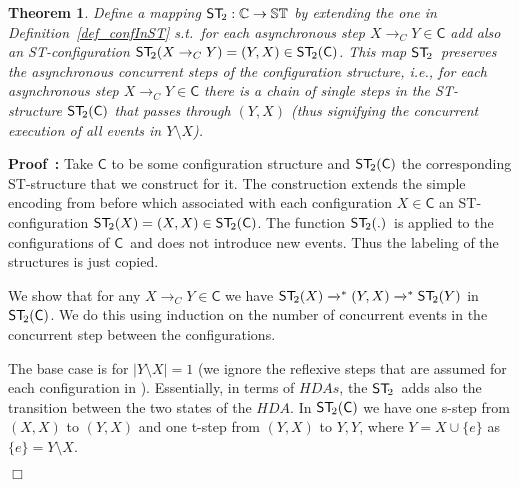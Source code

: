\documentclass[submission,copyright,creativecommons]{eptcs}
\newtheorem{theorem}{Theorem}[section]
\newenvironment{proof}[1][\!\!\,]{\vspace{1ex}\noindent\textbf{Proof #1: }}{\hfill$\Box$\vspace{2ex}}
\newcounter{case}
\newcommand\HDA{\ensuremath{\mathit{HDA}}}
\newcommand\HDAs{\ensuremath{\mathit{HDAs}}}
\newcommand\C{\ensuremath{\mathsf{C}}}
\newcommand\allC{\ensuremath{\mathbb{C}}}
\newcommand\allST{\ensuremath{\mathbb{ST}}}
\newcommand\stepTransConfGlabbeek{\ensuremath{\rightarrow_{C}}}
\newcommand\cintostSecond{\ensuremath{\mathsf{ST}_{\hspace{-0.4ex}2}}}
\newcommand\STofC[1]{\ensuremath{\cintostSecond(#1)}}
\newcommand{\transition}[1]{\ensuremath{\xrightarrow{#1}}}
\begin{document}
\begin{theorem}\label{th_configtoSTsteps}
Define a mapping $\cintostSecond:\allC\rightarrow\allST$ by extending the one in Definition~\ref{def_confInST} s.t.\ for each asynchronous step $X\stepTransConfGlabbeek Y\!\in\!\C$ add also an ST-configuration $\STofC{X\stepTransConfGlabbeek Y}=(Y,X)\in\STofC{\C}$.
This map \cintostSecond\ preserves the asynchronous concurrent steps of the configuration structure, i.e., for each asynchronous step $X\stepTransConfGlabbeek Y\in \C$ there is a chain of single steps in the ST-structure $\STofC{\C}$ that passes through $(Y,X)$ (thus signifying the concurrent execution of all events in $Y\setminus X$).
\end{theorem}

\begin{proof}
Take $\C$ to be some configuration structure and $\STofC{\C}$ the corresponding ST-structure that we construct for it.
The construction extends the simple encoding from before which associated with each configuration $X\in \C$ an ST-configuration $\STofC{X}=(X,X)\in\STofC{\C}$. 
The function \STofC{.}\ is applied to the configurations of \C\ and does not introduce new events. Thus the labeling of the structures is just copied.

We show that for any $X\stepTransConfGlabbeek Y\in \C$ we have $\cintostSecond(X)\transition{}^{*}(Y,X)\transition{}^{*}\cintostSecond(Y)$ in $\STofC{\C}$. We do this using induction on the number of concurrent events in the concurrent step between the configurations. 

The base case is for $|Y\setminus X|=1$ (we ignore the reflexive steps that are assumed for each configuration in \cite{GlabbeekP09configStruct}).
Essentially, in terms of \HDAs, the \cintostSecond\ adds also the transition between the two states of the \HDA. 
In $\STofC{\C}$ we have one s-step from $(X,X)$ to $(Y,X)$ and one t-step from $(Y,X)$ to $Y,Y$, where $Y=X\cup\{e\}$ as $\{e\}=Y\setminus X$.


\end{proof}
\end{document}
